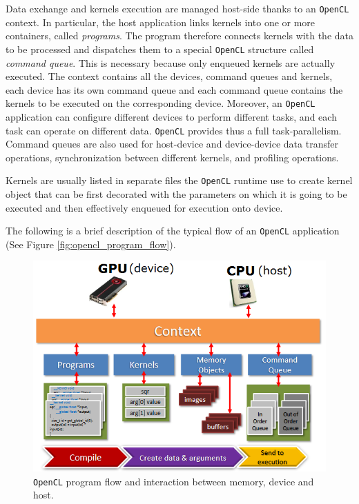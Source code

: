     Data exchange and kernels execution are managed host-side thanks
    to an \texttt{OpenCL} context. In particular, the host application links
    kernels into one or more containers, called \emph{programs}. The
    program therefore connects kernels with the data to be processed
    and dispatches them to a special \texttt{OpenCL} structure called
    \emph{command queue}. This is necessary because only enqueued
    kernels are actually executed. The context contains all the
    devices, command queues and kernels, each device has its own
    command queue and each command queue contains the kernels to be
    executed on the corresponding device. Moreover, an \texttt{OpenCL}
    application can configure different devices to perform different
    tasks, and each task can operate on different data. \texttt{OpenCL}
    provides thus a full task-parallelism. Command queues are also
    used for host-device and device-device data transfer operations,
    synchronization between different kernels, and profiling
    operations.
    
    
	Kernels are usually listed in separate
    files the \texttt{OpenCL} runtime use to create kernel object that
    can be first decorated with the parameters on which it is going to
    be executed and then effectively enqueued for execution onto device.
    
    The following is a brief description of the typical flow of an \texttt{OpenCL} application (See Figure \ref{fig:opencl_program_flow}).
    \begin{figure}
    	\centering
    	\includegraphics[width=1.0\textwidth]{./images/parallel_programming/opencl_program_flow}
    	\caption{\texttt{OpenCL} program flow and interaction between memory, device and host.}\label{fig:opencl_execmodel}
    \end{figure}

